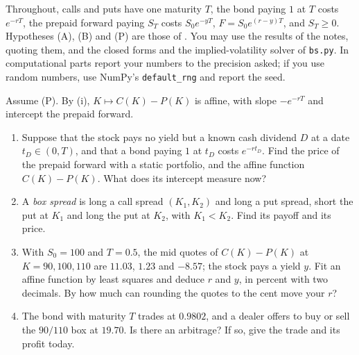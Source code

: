 Throughout, calls and puts have one maturity $T$, the bond paying $1$ at $T$ costs $e^{-rT}$, the
prepaid forward paying $S_T$ costs $S_0e^{-yT}$, $F=S_0e^{(r-y)T}$, and $S_T\ge0$. Hypotheses (A), (B) and
(P) are those of . You may use the results of the notes, quoting them, and the
closed forms and the implied-volatility solver of \texttt{bs.py}. In computational parts report your
numbers to the precision asked; if you use random numbers, use NumPy's \texttt{default\_rng} and report
the seed.

\begin{exercise}\label{ex:sk-parity}
\easy Assume (P). By (i), $K\mapsto C(K)-P(K)$ is affine, with slope $-e^{-rT}$
and intercept the prepaid forward.
\begin{enumerate}[label=(\alph*)]
  \item Suppose that the stock pays no yield but a known cash dividend $D$ at a date $t_D\in(0,T)$, and
    that a bond paying $1$ at $t_D$ costs $e^{-rt_D}$. Find the price of the prepaid forward with a static
    portfolio, and the affine function $C(K)-P(K)$. What does its intercept measure now?
  \item A \emph{box spread} is long a call spread $(K_1,K_2)$ and long a put spread, short the put at
    $K_1$ and long the put at $K_2$, with $K_1<K_2$. Find its payoff and its price.
  \item With $S_0=100$ and $T=0.5$, the mid quotes of $C(K)-P(K)$ at $K=90,100,110$ are $11.03$, $1.23$
    and $-8.57$; the stock pays a yield $y$. Fit an affine function by least squares and deduce $r$ and $y$,
    in percent with two decimals. By how much can rounding the quotes to the cent move your $r$?
  \item The bond with maturity $T$ trades at $0.9802$, and a dealer offers to buy or sell the $90/110$
    box at $19.70$. Is there an arbitrage? If so, give the trade and its profit today.
\end{enumerate}
\end{exercise}

